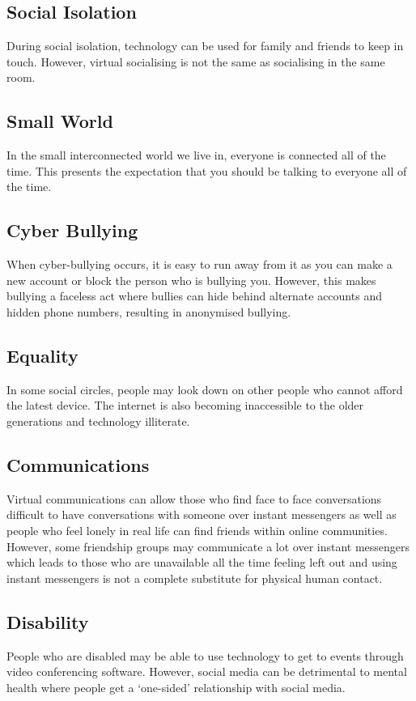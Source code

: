 \documentclass[a4paper,11pt, twocolumn]{article}
\begin{document}
\subsection{Social Isolation}
During social isolation, technology can be used for family and friends to keep in touch. However, virtual socialising is not the same as socialising in the same room.
\subsection{Small World}
In the small interconnected world we live in, everyone is connected all of the time. This presents the expectation that you should be talking to everyone all of the time.
\subsection{Cyber Bullying}
When cyber-bullying occurs, it is easy to run away from it as you can make a new account or block the person who is bullying you. However, this makes bullying a faceless act where bullies can hide behind alternate accounts and hidden phone numbers, resulting in anonymised bullying.
\subsection{Equality}
In some social circles, people may look down on other people who cannot afford the latest device. The internet is also becoming inaccessible to the older generations and technology illiterate.
\subsection{Communications}
Virtual communications can allow those who find face to face conversations difficult to have conversations with someone over instant messengers as well as people who feel lonely in real life can find friends within online communities. However, some friendship groups may communicate a lot over instant messengers which leads to those who are unavailable all the time feeling left out and using instant messengers is not a complete substitute for physical human contact. 
\subsection{Disability}
People who are disabled may be able to use technology to get to events through video conferencing software. However, social media can be detrimental to mental health where people get a `one-sided' relationship with social media.
\end{document}
